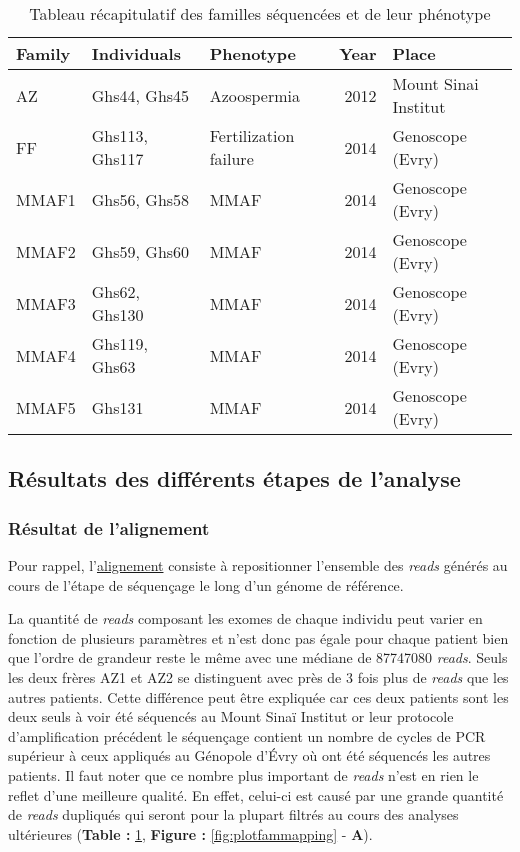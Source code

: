 \documentclass[12pt,twoside]{reedthesis}
\theoremstyle{definition}
\theoremstyle{definition}
\theoremstyle{remark}
\begin{document}
  \begin{longtable}[t]{lllrl}
  \caption{\label{tab:tabfam}Tableau récapitulatif des familles séquencées et de leur phénotype}\\
  \toprule
  Family & Individuals & Phenotype & Year & Place\\
  \midrule
  AZ & Ghs44, Ghs45 & Azoospermia & 2012 & Mount Sinai Institut\\
  FF & Ghs113, Ghs117 & Fertilization failure & 2014 & Genoscope (Evry)\\
  MMAF1 & Ghs56, Ghs58 & MMAF & 2014 & Genoscope (Evry)\\
  MMAF2 & Ghs59, Ghs60 & MMAF & 2014 & Genoscope (Evry)\\
  MMAF3 & Ghs62, Ghs130 & MMAF & 2014 & Genoscope (Evry)\\
  \addlinespace
  MMAF4 & Ghs119, Ghs63 & MMAF & 2014 & Genoscope (Evry)\\
  MMAF5 & Ghs131 & MMAF & 2014 & Genoscope (Evry)\\
  \bottomrule
  \end{longtable}
  
  \newpage 
  
  \subsection{Résultats des différents étapes de
  l'analyse}\label{resultats-des-differents-etapes-de-lanalyse}
  
  \subsubsection{Résultat de l'alignement}\label{resultat-de-lalignement}
  
  Pour rappel, l'\href{\%7B\#lalignement\%7D}{alignement} consiste à
  repositionner l'ensemble des \emph{reads} générés au cours de l'étape de
  séquençage le long d'un génome de référence.
  
  La quantité de \emph{reads} composant les exomes de chaque individu peut
  varier en fonction de plusieurs paramètres et n'est donc pas égale pour
  chaque patient bien que l'ordre de grandeur reste le même avec une
  médiane de 87747080 \emph{reads}. Seuls les deux frères AZ1 et AZ2 se
  distinguent avec près de 3 fois plus de \emph{reads} que les autres
  patients. Cette différence peut être expliquée car ces deux patients
  sont les deux seuls à voir été séquencés au Mount Sinaï Institut or leur
  protocole d'amplification précédent le séquençage contient un nombre de
  cycles de PCR supérieur à ceux appliqués au Génopole d'Évry où ont été
  séquencés les autres patients. Il faut noter que ce nombre plus
  important de \emph{reads} n'est en rien le reflet d'une meilleure
  qualité. En effet, celui-ci est causé par une grande quantité de
  \emph{reads} dupliqués qui seront pour la plupart filtrés au cours des
  analyses ultérieures (\textbf{Table :} \ref{tab:tabfam}, \textbf{Figure
  : }\ref{fig:plotfammapping} - \textbf{A}).
  
\end{document}
